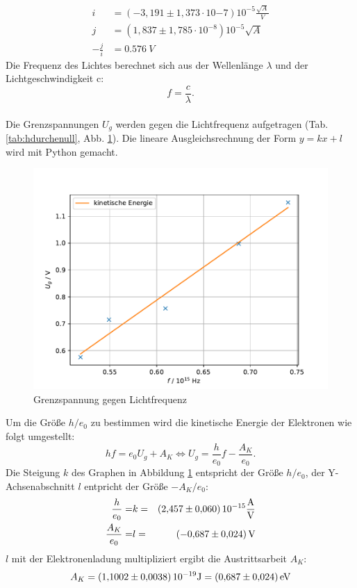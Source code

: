 \FloatBarrier
\begin{align*}
  i &= (-3,191 \pm  1,373 \cdot 10{-7}) 10^{-5}\si{\frac{\sqrt{A}}{V}}\\
  j &= (1,837 \pm 1,785 \cdot 10^{-8}) 10^{-5}\si{\sqrt{A}}\\
  -\frac{j}{i} &= \SI{0.576}{V}
\end{align*}
\FloatBarrier
Die Frequenz des Lichtes berechnet sich aus der Wellenlänge $\lambda$ und der Lichtgeschwindigkeit c:
\begin{equation*}
  f=\frac{c}{\lambda}.
\end{equation*}
\\Die Grenzspannungen $U_g$ werden gegen die Lichtfrequenz aufgetragen (Tab. \ref{tab:hdurchenull}, Abb. \ref{fig:hdurchenull}).
Die lineare Ausgleichsrechnung der Form $y=kx+l$ wird mit Python gemacht.

\begin{figure}[h!]
  \centering
  \includegraphics[width=\textwidth]{hdurchenull.pdf}
  \caption{Grenzspannung gegen Lichtfrequenz}
  \label{fig:hdurchenull}
\end{figure}
Um die Größe $h/e_0$ zu bestimmen wird die kinetische Energie der Elektronen wie folgt umgestellt:
\begin{equation*}
  h f = e_0 U_g + A_K \Leftrightarrow
  U_g = \frac{h}{e_0} f -\frac{A_K}{e_0}.
\end{equation*}
Die Steigung $k$ des Graphen in Abbildung \ref{fig:hdurchenull} entspricht der Größe $h/e_0$, der Y-Achsenabschnitt $l$ entpricht der Größe $-A_K/e_0$:
\begin{align*}
  \frac{h}{e_0} =& k =& \SI{2.457 \pm 0.060} 10^{-15}\si{\frac{A}{V}}\\
  \frac{A_K}{e_0} =& l =& \SI{-0.687 \pm 0.024}{V}
\end{align*}
$l$ mit der Elektronenladung \cite{taschenrechner} multipliziert ergibt die Austrittsarbeit $A_K$:
\begin{equation*}
  A_K=\SI{1.1002 \pm 0.0038}{10^{-19}} \si{J} = \SI{0.687 \pm 0.024}{eV}
\end{equation*}
\FloatBarrier
